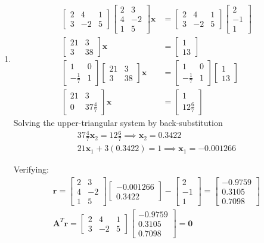 \documentclass[]{article}
\newcommand{\bbm}{\begin{bmatrix}}		%
\newcommand{\ebm}{\end{bmatrix}}		%
\newcommand{\x}{\bm{x}}					%
\begin{document}
\begin{enumerate}
\begin{enumerate}
        
	  \item
        \[\begin{split}
        \bbm 2&4&1\\3&-2&5\ebm \bbm 2&3\\4&-2\\1&5\ebm \x &= \bbm 2&4&1\\3&-2&5\ebm \bbm 2\\-1\\1\ebm \\
        \bbm 21 & 3 \\ 3 & 38 \ebm \x &= \bbm 1 \\ 13 \ebm \\
        \bbm 1 & 0 \\ -\frac{1}{7} & 1 \ebm \bbm 21 & 3 \\ 3 & 38 \ebm \x &= \bbm 1 & 0 \\ -\frac{1}{7} & 1 \ebm \bbm 1 \\ 13 \ebm \\
        \bbm 21 & 3 \\ 0 & 37 \frac{4}{7} \ebm \x &= \bbm 1 \\ 12 \frac{6}{7} \ebm
        \end{split}\]
        Solving the upper-triangular system by back-substitution
        \begin{gather*}
          37 \frac{4}{7} \x_2 = 12 \frac{6}{7} \implies \x_2 = 0.3422 \\
          21 \x_1 + 3(0.3422) = 1 \implies \x_1 = -0.001266
        \end{gather*}

        Verifying:
        \begin{gather*}
          \bm{r} = \bbm 2&3\\4&-2\\1&5\ebm \bbm -0.001266 \\ 0.3422 \ebm - \bbm 2\\-1\\1\ebm = \bbm -0.9759 \\ 0.3105 \\ 0.7098 \ebm \\
          \bm{A}^T\bm{r} = \bbm 2&4&1\\3&-2&5\ebm \bbm -0.9759 \\ 0.3105 \\ 0.7098 \ebm = \bm{0}
        \end{gather*}

      \end{enumerate}


\end{enumerate}
\end{document}
